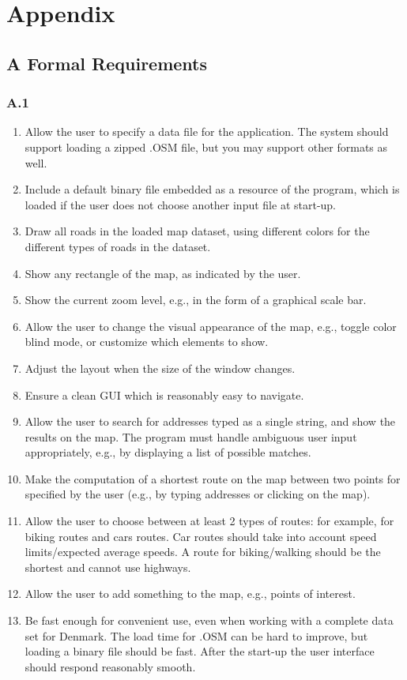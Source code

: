 \newpage
\section{Appendix}
\subsection*{A Formal Requirements}
\subsubsection*{A.1}
\begin{enumerate}
    \item Allow the user to specify a data file for the application. The system should support loading a zipped .OSM file, but you may support other formats as well.
\item Include a default binary file embedded as a resource of the program, which is loaded if the user does not choose another input file at start-up.
\item Draw all roads in the loaded map dataset, using different colors for the different types of roads in the dataset.
\item Show any rectangle of the map, as indicated by the user.
\item Show the current zoom level, e.g., in the form of a graphical scale bar.
\item Allow the user to change the visual appearance of the map, e.g., toggle color blind mode, or customize which elements to show.
\item Adjust the layout when the size of the window changes.
\item Ensure a clean GUI which is reasonably easy to navigate.
\item Allow the user to search for addresses typed as a single string, and show the results on the map. The program must handle ambiguous user input appropriately, e.g., by displaying a list of possible matches.
\item Make the computation of a shortest route on the map between two points for specified by the user (e.g., by typing addresses or clicking on the map).
\item Allow the user to choose between at least 2 types of routes: for example, for biking routes and cars routes. Car routes should take into account speed limits/expected average speeds. A route for biking/walking should be the shortest and cannot use highways.
\item Allow the user to add something to the map, e.g., points of interest.
\item Be fast enough for convenient use, even when working with a complete data set for Denmark. The load time for .OSM can be hard to improve, but loading a binary file should be fast. After the start-up the user interface should respond reasonably smooth.
\end{enumerate}
